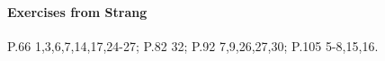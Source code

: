 \documentclass[12pt,twoside]{article}
\begin{document}
\paragraph*{Exercises from Strang} P.66 1,3,6,7,14,17,24-27; P.82 32; P.92 7,9,26,27,30; P.105 5-8,15,16.

\end{document}
